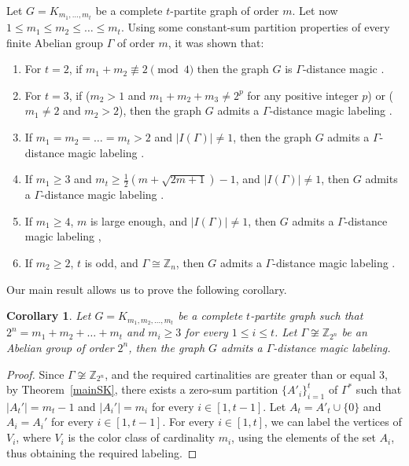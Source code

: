 \documentclass[final]{dmtcs-episciences}
\newtheorem{cor}[thm]{Corollary}
\def \bsk {\bigskip}
\newcommand{\zet}{\mathbb{Z}}
\begin{document}
Let $G=K_{m_1,\ldots,m_t}$ be a complete $t$-partite graph of order $m$. Let now $1\leq m_1\leq m_2 \leq\ldots\leq m_t$. Using some constant-sum partition properties of every finite Abelian group $\Gamma$ of order $m$, it was shown that:
\begin{enumerate}
\item  For $t=2$, if  $m_1 + m_2\not\equiv 2\pmod 4$ then the graph $G$ is  $\Gamma$-distance magic \citep{CichaczOM}.
	\item  For $t=3$, if ($m_2>1$ and  $m_1 + m_2+m_3\neq 2^p$ for any positive integer $p$) or  ($m_1\neq 2$ and $m_2>2$), then the graph $G$ admits a $\Gamma$-distance magic labeling \citep{Cic3}.
	\item If $m_1=m_2=\ldots=m_t>2$ and $|I(\Gamma)|\neq 1$, then the graph $G$ admits a $\Gamma$-distance magic labeling \citep{CicZ}.
	\item If $m_1\geq 3$ and $m_t\geq \frac{1}{2}(m +\sqrt{2m+1}) -1$, and $|I(\Gamma)|\neq 1$, then\/ $G$ admits a $\Gamma$-distance magic labeling \citep{CicTuz}.	
	\item  If $m_1\geq 4$, $m$ is large enough, and $|I(\Gamma)|\neq 1$, then\/ $G$ admits a $\Gamma$-distance magic labeling \citep{CicTuz},
	\item If $m_2\geq 2$, $t$ is odd, and $\Gamma\cong\zet_n$, then\/ $G$ admits a $\Gamma$-distance magic labeling \citep{FREYBERG2019}.
\end{enumerate}


Our main result allows us to prove the following corollary.

\begin{cor}\label{even} Let\/ $G = K_{m_1,m_2,\ldots,m_t}$ be a complete\/
 $t$-partite graph such that\/ $2^n = m_1 +m_2 +\ldots+m_{t}$ and\/
 $m_i\geq 3$ for every\/ $1\leq i \leq t$.
 Let\/ $\Gamma\not\cong \zet_{2^n}$ be an Abelian group of order\/ $2^n$, then the graph\/ $G$ admits a $\Gamma$-distance magic labeling.
  \end{cor}
\begin{proof}
Since $\Gamma\not\cong \zet_{2^n}$, and the required cartinalities are greater than or equal $3$, by Theorem~\ref{mainSK}, there exists a zero-sum partition $\{A'_i\}_{i=1}^{t}$ of $\Gamma^*$ such that $|A_t'|=m_t-1$ and $|A_i'| =m_i$ for every  {$i\in[1, t-1]$}.
Let $A_t=A'_t\cup \{0\}$ and $A_i=A_i'$ for every  {$i\in[1,t-1]$}. For every $i\in[1,t]$, we can label the vertices of $V_i$, where $V_i$ is the color class of cardinality $m_i$, using the elements of the set $A_i$, thus obtaining the required labeling.
\end{proof}\bsk
\end{document}
